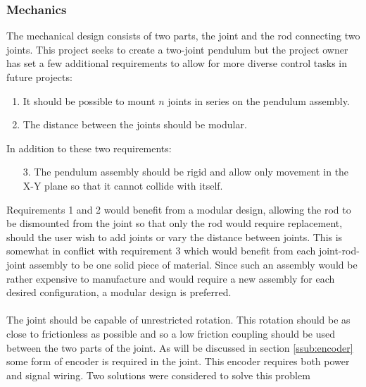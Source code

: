\subsubsection{Mechanics} %
\label{ssub:mechanics}
The mechanical design consists of two parts, the joint and the rod connecting two joints.
This project seeks to create a two-joint pendulum but the project owner has set a few additional requirements to allow for more diverse control tasks in future projects:
\begin{enumerate}
	\item It should be possible to mount $n$ joints in series on the pendulum assembly.
	\item The distance between the joints should be modular.
\end{enumerate}
In addition to these two requirements:
\begin{enumerate}
	\item [3.] The pendulum assembly should be rigid and allow only movement in the X-Y plane so that it cannot collide with itself.
\end{enumerate}
Requirements 1 and 2 would benefit from a modular design, allowing the rod to be dismounted from the joint so that only the rod would require replacement, should the user wish to add joints or vary the distance between joints.
This is somewhat in conflict with requirement 3 which would benefit from each joint-rod-joint assembly to be one solid piece of material.
Since such an assembly would be rather expensive to manufacture and would require a new assembly for each desired configuration, a modular design is preferred.
\\~\\
The joint should be capable of unrestricted rotation.
This rotation should be as close to frictionless as possible and so a low friction coupling should be used between the two parts of the joint.
As will be discussed in section \ref{ssub:encoder} some form of encoder is required in the joint.
This encoder requires both power and signal wiring.
Two solutions were considered to solve this problem
